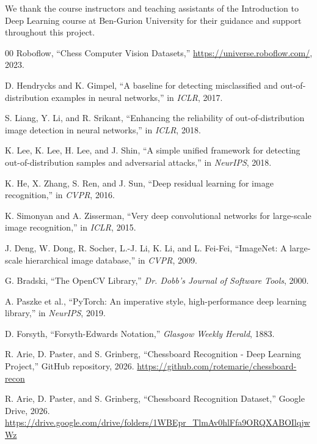 \documentclass[conference]{IEEEtran}
\begin{document}
We thank the course instructors and teaching assistants of the Introduction to Deep Learning course at Ben-Gurion University for their guidance and support throughout this project.

\begin{thebibliography}{00}
 Roboflow, ``Chess Computer Vision Datasets,'' \url{https://universe.roboflow.com/}, 2023.

 D. Hendrycks and K. Gimpel, ``A baseline for detecting misclassified and out-of-distribution examples in neural networks,'' in \textit{ICLR}, 2017.

 S. Liang, Y. Li, and R. Srikant, ``Enhancing the reliability of out-of-distribution image detection in neural networks,'' in \textit{ICLR}, 2018.

 K. Lee, K. Lee, H. Lee, and J. Shin, ``A simple unified framework for detecting out-of-distribution samples and adversarial attacks,'' in \textit{NeurIPS}, 2018.

 K. He, X. Zhang, S. Ren, and J. Sun, ``Deep residual learning for image recognition,'' in \textit{CVPR}, 2016.

 K. Simonyan and A. Zisserman, ``Very deep convolutional networks for large-scale image recognition,'' in \textit{ICLR}, 2015.

 J. Deng, W. Dong, R. Socher, L.-J. Li, K. Li, and L. Fei-Fei, ``ImageNet: A large-scale hierarchical image database,'' in \textit{CVPR}, 2009.

 G. Bradski, ``The OpenCV Library,'' \textit{Dr. Dobb's Journal of Software Tools}, 2000.

 A. Paszke et al., ``PyTorch: An imperative style, high-performance deep learning library,'' in \textit{NeurIPS}, 2019.

 D. Forsyth, ``Forsyth-Edwards Notation,'' \textit{Glasgow Weekly Herald}, 1883.

 R. Arie, D. Paster, and S. Grinberg, ``Chessboard Recognition - Deep Learning Project,'' GitHub repository, 2026. \url{https://github.com/rotemarie/chessboard-recon}

 R. Arie, D. Paster, and S. Grinberg, ``Chessboard Recognition Dataset,'' Google Drive, 2026. \url{https://drive.google.com/drive/folders/1WBEpr_TlmAv0hlFfa9ORQXABOIlqjwWz}
\end{thebibliography}
\end{document}
